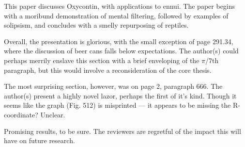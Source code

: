 \documentclass[12pt]{sigbovik-review}
\author{I got my friends to fill out a madlib}
\begin{document}
\maketitle

This paper discusses Oxycontin, with applications to ennui.  The paper begins
with a moribund demonstration of mental filtering, followed by examples of
solipsism, and concludes with a smelly repurposing of reptiles.

Overall, the presentation is glorious, with the small exception of page 291.34,
where the discussion of beer cans falls below expectations.  The author(s)
could perhaps merrily enslave this section with a brief enveloping of the
$\pi$/7th paragraph, but this would involve a reconsideration of the core
thesis.

The most surprising section, however, was on page 2, paragraph 666.  The
author(s) present a highly novel lazor, perhaps the first of it's kind.  Though
it seems like the graph (Fig. 512) is misprinted --- it appears to be missing
the R-coordinate?  Unclear.

Promising results, to be sure.  The reviewers are regretful of the impact this
will have on future research.
\end{document}
